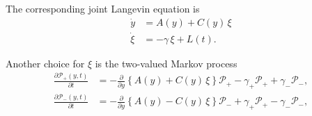 \documentclass{book}
\numberwithin{equation}{section}
\theoremstyle{plain}
\theoremstyle{definition}
\theoremstyle{remark}
\theoremstyle{BoldStyle}
\numberwithin{exercise}{section}
\begin{document}
The corresponding joint Langevin equation is
\begin{equation}
\begin{aligned}
  \dot y &= A(y) + C(y) \, \xi \\
  \dot \xi &= -\gamma \, \xi + L(t).
\end{aligned}
\label{eq:Langevin_joint_y_xi}
\end{equation}

Another choice for $\xi$ is the two-valued Markov process
\begin{equation}
\begin{aligned}
  \frac{ \partial \mathscr P_+(y, t) } { \partial t }
  &=
  - \frac{ \partial } { \partial y }
  \left\{
    A(y) + C(y) \, \xi
  \right\} \mathscr P_+
  -\gamma_+ \mathscr P_+ + \gamma_- \mathscr P_-,
  \\
  \frac{ \partial \mathscr P_-(y, t) } { \partial t }
  &=
  - \frac{ \partial } { \partial y }
  \left\{
    A(y) - C(y) \, \xi
  \right\} \mathscr P_-
  + \gamma_+ \mathscr P_+ - \gamma_- \mathscr P_-,
\end{aligned}
\label{eq:Langevin_joint_y_xi}
\end{equation}
\end{document}
